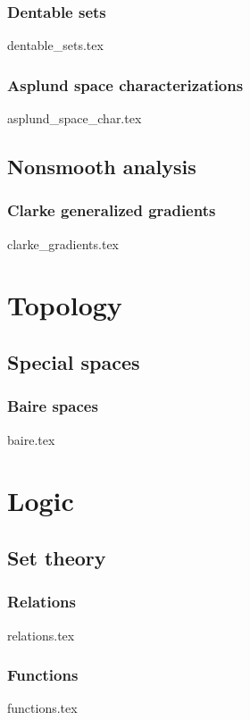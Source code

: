 \documentclass[numbers=endperiod, bibliography=totocnumbered]{scrartcl}
\begin{document}
\subsubsection{Dentable sets}\label{sec:dentable_sets}
{dentable_sets.tex}
\subsubsection{Asplund space characterizations}\label{sec:asplund_space_char}
{asplund_space_char.tex}

\subsection{Nonsmooth analysis}\label{sec:nonsmooth_analysis}
\subsubsection{Clarke generalized gradients}\label{sec:clarke_gradients}
{clarke_gradients.tex}

\section{Topology}\label{sec:topology}
\subsection{Special spaces}\label{sec:topology/special_spaces}
\subsubsection{Baire spaces}\label{sec:baire_spaces}
{baire.tex}

\section{Logic}\label{sec:logic}
\subsection{Set theory}\label{sec:sets}
\subsubsection{Relations}\label{sec:sets/relations}
{relations.tex}
\subsubsection{Functions}\label{sec:sets/functions}
{functions.tex}

\printbibliography
\end{document}
